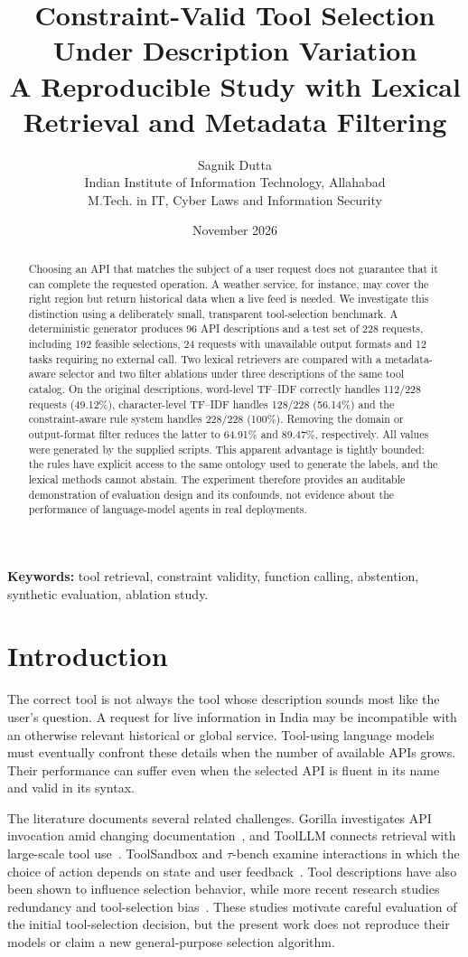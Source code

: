 \documentclass[10pt,a4paper]{article}
\title{Constraint-Valid Tool Selection Under Description Variation\\\large A Reproducible Study with Lexical Retrieval and Metadata Filtering}
\author{Sagnik Dutta\\\small Indian Institute of Information Technology, Allahabad\\\small M.Tech. in IT, Cyber Laws and Information Security}
\date{November 2026}
\begin{document}
\maketitle
\begin{abstract}
Choosing an API that matches the subject of a user request does not guarantee that it can complete the requested operation. A weather service, for instance, may cover the right region but return historical data when a live feed is needed. We investigate this distinction using a deliberately small, transparent tool-selection benchmark. A deterministic generator produces 96 API descriptions and a test set of 228 requests, including 192 feasible selections, 24 requests with unavailable output formats and 12 tasks requiring no external call. Two lexical retrievers are compared with a metadata-aware selector and two filter ablations under three descriptions of the same tool catalog. On the original descriptions, word-level TF--IDF correctly handles 112/228 requests (49.12\%), character-level TF--IDF handles 128/228 (56.14\%) and the constraint-aware rule system handles 228/228 (100\%). Removing the domain or output-format filter reduces the latter to 64.91\% and 89.47\%, respectively. All values were generated by the supplied scripts. This apparent advantage is tightly bounded: the rules have explicit access to the same ontology used to generate the labels, and the lexical methods cannot abstain. The experiment therefore provides an auditable demonstration of evaluation design and its confounds, not evidence about the performance of language-model agents in real deployments.
\end{abstract}
\noindent\textbf{Keywords:} tool retrieval, constraint validity, function calling, abstention, synthetic evaluation, ablation study.
\section{Introduction}
The correct tool is not always the tool whose description sounds most like the user's question. A request for live information in India may be incompatible with an otherwise relevant historical or global service. Tool-using language models must eventually confront these details when the number of available APIs grows. Their performance can suffer even when the selected API is fluent in its name and valid in its syntax.

The literature documents several related challenges. Gorilla investigates API invocation amid changing documentation~\cite{patil2023gorilla}, and ToolLLM connects retrieval with large-scale tool use~\cite{qin2024toolllm}. ToolSandbox and $\tau$-bench examine interactions in which the choice of action depends on state and user feedback~\cite{lu2025toolsandbox,yao2024taubench}. Tool descriptions have also been shown to influence selection behavior, while more recent research studies redundancy and tool-selection bias~\cite{faghih2025toolpreferences,blankenstein2026biasbusters,liu2026toolscope}. These studies motivate careful evaluation of the initial tool-selection decision, but the present work does not reproduce their models or claim a new general-purpose selection algorithm.
\end{document}
